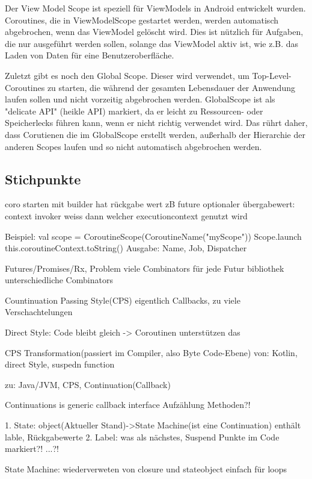 \documentclass[fontsize=12pt,paper=a4,twoside=semi,parskip=half-,headsepline,headinclude]{scrreprt}
\begin{document}
Der View Model Scope ist speziell für ViewModels in Android entwickelt wurden. Coroutines, die in ViewModelScope gestartet werden, werden automatisch abgebrochen, wenn das ViewModel gelöscht wird. Dies ist nützlich für Aufgaben, die nur ausgeführt werden sollen, solange das ViewModel aktiv ist, wie z.B. das Laden von Daten für eine Benutzeroberfläche.

Zuletzt gibt es noch den Global Scope. Dieser wird verwendet, um Top-Level-Coroutines zu starten, die während der gesamten Lebensdauer der Anwendung laufen sollen und nicht vorzeitig abgebrochen werden. GlobalScope ist als "delicate API" (heikle API) markiert, da er leicht zu Ressourcen- oder Speicherlecks führen kann, wenn er nicht richtig verwendet wird. Das rührt daher, dass Corutienen die im GlobalScope erstellt werden, außerhalb der Hierarchie der anderen Scopes laufen und so nicht automatisch abgebrochen werden.




\newpage

\subsection{Stichpunkte}

coro starten mit builder
hat rückgabe wert zB future
optionaler übergabewert: context
invoker weiss dann welcher executioncontext genutzt wird

Beispiel:
val scope = CoroutineScope(CoroutineName("myScope"))
Scope.launch{
	this.coroutineContext.toString()
}
Ausgabe: Name, Job, Dispatcher

Futures/Promises/Rx, Problem viele Combinators
für jede Futur bibliothek unterschiedliche Combinators

Countinuation Passing Style(CPS)
eigentlich Callbacks, zu viele Verschachtelungen

Direct Style: Code bleibt gleich -> Coroutinen unterstützen das

CPS Transformation(passiert im Compiler, also Byte Code-Ebene)
von:
Kotlin, direct Style, suspedn function

zu:
Java/JVM, CPS, Continuation(Callback)

Continuations is generic callback interface
Aufzählung Methoden?!

1. State: object(Aktueller Stand)->State Machine(ist eine Continuation)
	enthält lable, Rückgabewerte
2. Label: was als nächstes, Suspend Punkte im Code markiert?!
...?!

State Machine:
wiederverweten von closure und stateobject
einfach für loops
\end{document}

